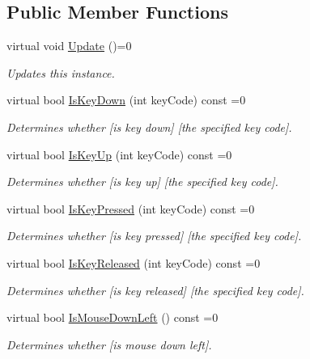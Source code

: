 \subsection*{Public Member Functions}
\begin{DoxyCompactItemize}
\item 
virtual void \hyperlink{class_i_input_handler_af53f50e4542c0e68d7dde659defa960a}{Update} ()=0
\begin{DoxyCompactList}\small\item\em Updates this instance. \end{DoxyCompactList}\item 
virtual bool \hyperlink{class_i_input_handler_afcf521e0cb3d6e3161ff15d1765a658e}{Is\+Key\+Down} (int key\+Code) const  =0
\begin{DoxyCompactList}\small\item\em Determines whether \mbox{[}is key down\mbox{]} \mbox{[}the specified key code\mbox{]}. \end{DoxyCompactList}\item 
virtual bool \hyperlink{class_i_input_handler_a234ffb504b1f22407ccf10964585b6be}{Is\+Key\+Up} (int key\+Code) const  =0
\begin{DoxyCompactList}\small\item\em Determines whether \mbox{[}is key up\mbox{]} \mbox{[}the specified key code\mbox{]}. \end{DoxyCompactList}\item 
virtual bool \hyperlink{class_i_input_handler_a05c20ba8e64fcec8199154447795edf7}{Is\+Key\+Pressed} (int key\+Code) const  =0
\begin{DoxyCompactList}\small\item\em Determines whether \mbox{[}is key pressed\mbox{]} \mbox{[}the specified key code\mbox{]}. \end{DoxyCompactList}\item 
virtual bool \hyperlink{class_i_input_handler_ada195f0b3a10b1e9452976f2429d1051}{Is\+Key\+Released} (int key\+Code) const  =0
\begin{DoxyCompactList}\small\item\em Determines whether \mbox{[}is key released\mbox{]} \mbox{[}the specified key code\mbox{]}. \end{DoxyCompactList}\item 
virtual bool \hyperlink{class_i_input_handler_a9f24156759a806dd3c23ebac70640822}{Is\+Mouse\+Down\+Left} () const  =0
\begin{DoxyCompactList}\small\item\em Determines whether \mbox{[}is mouse down left\mbox{]}. \end{DoxyCompactList}\item 

\end{DoxyCompactItemize}
